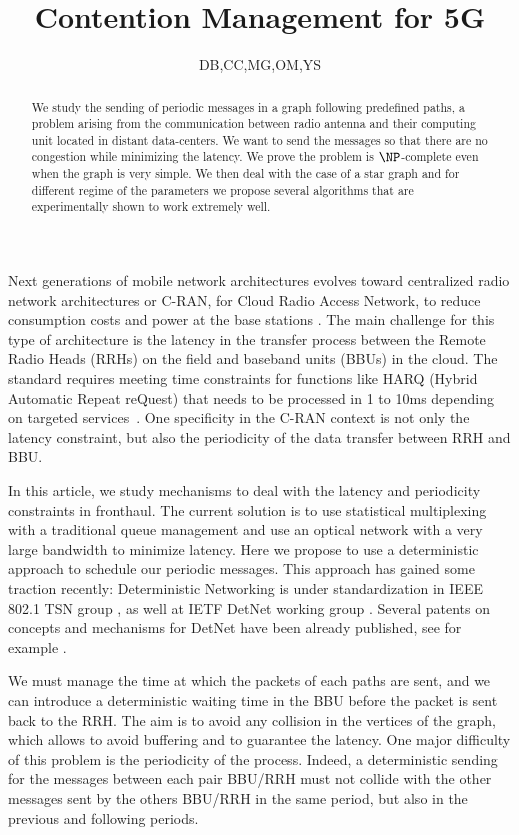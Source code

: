 \documentclass[a4paper,10pt]{article}
\title{Contention Management for 5G}
\author{DB,CC,MG,OM,YS}
\begin{document}
\maketitle
\begin{abstract}
We study the sending of periodic messages in a graph following predefined paths, a problem arising from the communication between radio antenna and their computing unit located in distant data-centers.  We want to send the messages so that there are no congestion while minimizing the latency. We prove the problem is $\NP$-complete even when the graph is very simple. We then deal with the case of a star graph and for different regime of the parameters we propose several algorithms that are experimentally shown to work extremely well.
\end{abstract}

Next generations of mobile network architectures evolves toward centralized radio network architectures or C-RAN, for Cloud Radio Access Network, to reduce consumption costs and power at the base stations \cite{mobile2011c}. The main challenge for this type of architecture is the latency in the transfer process between the Remote Radio Heads (RRHs) on the field and baseband units (BBUs) in the cloud. The standard requires meeting time constraints for functions like HARQ (Hybrid Automatic Repeat reQuest) that needs to be processed in 1 to 10ms depending on targeted services~\cite{bouguen2012lte}. One specificity in the C-RAN context is not only the latency constraint, but also the periodicity of the data transfer between RRH and BBU.

 In this article, we study mechanisms to deal with the latency and periodicity constraints in fronthaul.  The current solution is to use statistical multiplexing with a traditional queue management and use an optical network with a very large bandwidth to minimize latency. Here we propose to use a deterministic approach to schedule our periodic messages. This approach has gained some traction recently: Deterministic
 Networking is under standardization in IEEE 802.1 TSN group \cite{finn-detnet-architecture-08}, as well at IETF DetNet working group \cite{ieee802}. Several patents on concepts and mechanisms for DetNet have been already published, see for example \cite{howe2005time,leclerc2016transmission}.
 
 We must manage the time at which the packets of each paths are sent, and we can introduce a deterministic waiting time in the BBU before the packet is sent back to the RRH. The aim is to avoid any collision in the vertices of the graph, which allows to avoid buffering and to guarantee the latency. 
  One major difficulty of this problem is the periodicity of the process. Indeed, a deterministic sending for the messages between each pair BBU/RRH must not collide with the other messages sent by the others BBU/RRH in the same period, but also in the previous and following periods.\\
 
\end{document}
